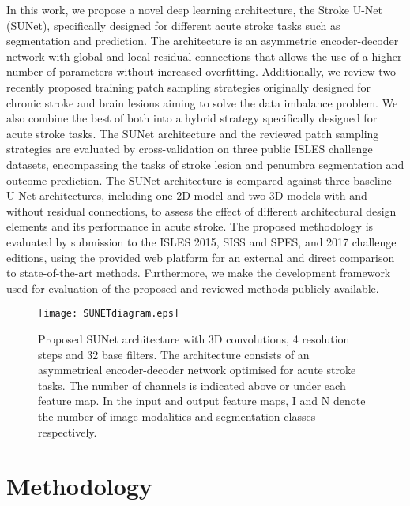 \documentclass[letterpaper,final,authoryear,3p,times,twocolumn]{elsarticle}
\begin{document}
In this work, we propose a novel deep learning architecture, the Stroke U-Net (SUNet), specifically designed for different acute stroke tasks such as segmentation and prediction. The architecture is an asymmetric encoder-decoder network with global and local residual connections that allows the use of a higher number of parameters without increased overfitting. Additionally, we review two recently proposed training patch sampling strategies originally designed for chronic stroke and brain lesions aiming to solve the data imbalance problem. We also combine the best of both into a hybrid strategy specifically designed for acute stroke tasks. The SUNet architecture and the reviewed patch sampling strategies are evaluated by cross-validation on three public ISLES challenge datasets, encompassing the tasks of stroke lesion and penumbra segmentation and outcome prediction. The SUNet architecture is compared against three baseline U-Net architectures, including one 2D model and two 3D models with and without residual connections, to assess the effect of different architectural design elements and its performance in acute stroke. The proposed methodology is evaluated by submission to the ISLES 2015, SISS and SPES, and 2017 challenge editions, using the provided web platform for an external and direct comparison to state-of-the-art methods. Furthermore, we make the development framework used for evaluation of the proposed and reviewed methods publicly available.

\begin{figure*}
	\centering
	\texttt{[image: SUNETdiagram.eps]}
	\caption[]{Proposed SUNet architecture with 3D convolutions, 4 resolution steps and 32 base filters. The architecture consists of an asymmetrical encoder-decoder network optimised for acute stroke tasks. The number of channels is indicated above or under each feature map. In the input and output feature maps, I and N denote the number of image modalities and segmentation classes respectively.}
	\label{fig:sunet}
\end{figure*}

\section{Methodology}
\end{document}
